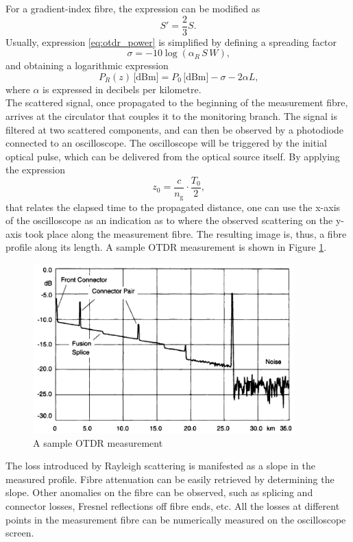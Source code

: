\documentclass{standalone}
\begin{document}
For a gradient-index fibre, the expression can be modified as
\begin{equation}
S' = \frac{2}{3} S \textrm{.}
\end{equation}
Usually, expression \ref{eq:otdr_power} is simplified by defining a spreading factor
\begin{equation}
\sigma = -10 \log \left( \alpha_R \, S \, W \right) \textrm{,}
\end{equation}
and obtaining a logarithmic expression
\begin{equation}
P_R(z) \,\textrm{[dBm]} = P_0 \,\textrm{[dBm]} - \sigma - 2\alpha L \textrm{,}
\end{equation}
where $\alpha$ is expressed in decibels per kilometre. \\

The scattered signal, once propagated to the beginning of the measurement fibre, arrives at the circulator that couples it to the monitoring branch. The signal is filtered at two scattered components, and can then be observed by a photodiode connected to an oscilloscope. The oscilloscope will be triggered by the initial optical pulse, which can be delivered from the optical source itself. By applying the expression 
\begin{equation} \label{eq:otdr_time_distance}
z_0 = \frac{c}{n_\textrm{g}} \cdot \frac{T_0}{2} \textrm{,}
\end{equation}
that relates the elapsed time to the propagated distance, one can use the x-axis of the oscilloscope as an indication as to where the observed scattering on the y-axis took place along the measurement fibre. The resulting image is, thus, a fibre profile along its length. A sample OTDR measurement is shown in Figure \ref{fig:otdr_sample}.
\begin{figure}[h]
	\centering
	\includegraphics[width=0.9\textwidth]{otdr_sample.png}
	\caption{A sample OTDR measurement \cite{fer:oks}}
	\label{fig:otdr_sample}
\end{figure}
The loss introduced by Rayleigh scattering is manifested as a slope in the measured profile. Fibre attenuation can be easily retrieved by determining the slope. Other anomalies on the fibre can be observed, such as splicing and connector losses, Fresnel reflections off fibre ends, etc. All the losses at different points in the measurement fibre can be numerically measured on the oscilloscope screen.\\
\end{document}
